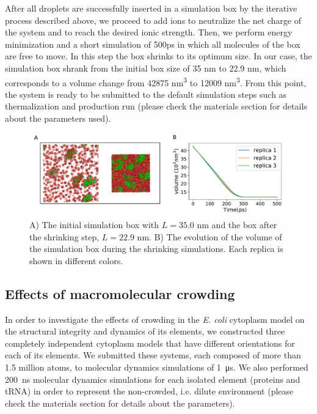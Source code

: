 \documentclass[journal=jcisd8,manuscript=article]{achemso}
\begin{document}
After all droplets are successfully inserted in a simulation box by
the iterative process described above, we proceed to add ions to
neutralize the net charge of the system and to reach the desired ionic
strength. Then, we perform energy minimization and a short simulation
 of 500ps in which all molecules of the box are free to move. In
this step the box shrinks to its optimum size. In our case, the
simulation box shrank from the initial box size of 35 nm to 22.9 nm,
which corresponds to a volume change from 42875 nm\textsuperscript{3}
to 12009 nm\textsuperscript{3}. From this point, the system is ready
to be submitted to the default simulation steps such as thermalization
and production run (please check the materials section for details
about the parameters used).

\begin{figure}[H]
\includegraphics[scale=0.5]{shrinking.pdf} 
\caption{A) The initial simulation box with $L=35.0$ nm and the box
  after the shrinking step, $L=22.9$ nm. B) The evolution of the
  volume of the simulation box during the shrinking simulations. Each
  replica is shown in different colors. }
\end{figure}

\subsection{Effects of macromolecular crowding}

In order to investigate the effects of crowding in the
\textit{E. coli} cytoplasm model on the structural integrity and
dynamics of its elements, we constructed three completely independent
cytoplasm models that have different orientations for each of its
elements. We submitted these systems, each composed of more than 1.5
million atoms, to molecular dynamics simulations of
\SI{1}{\micro\second}. We also performed \SI{200}{\nano\second}
molecular dynamics simulations for each isolated element (proteins and
tRNA) in order to represent the non-crowded, i.e. dilute environment
(please check the materials section for details about the parameters).
\end{document}
